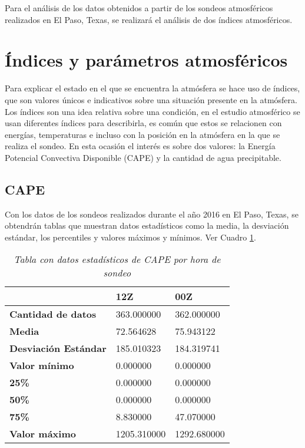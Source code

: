 Para el análisis de los datos obtenidos a partir de los sondeos atmosféricos realizados en El Paso, Texas, se realizará el análisis de dos índices atmosféricos.

\section{Índices y parámetros atmosféricos}
\noindent Para explicar el estado en el que se encuentra la atmósfera se hace uso de índices, que son valores únicos e indicativos sobre una situación presente en la atmósfera. Los índices son una idea relativa sobre una condición, en el estudio atmosférico se usan diferentes índices para describirla, es común que estos se relacionen con energías, temperaturas e incluso con la posición en la atmósfera en la que se realiza el sondeo. En esta ocasión el interés es sobre dos valores: la Energía Potencial Convectiva Disponible (CAPE) y la cantidad de agua precipitable. \cite{blanchard1998assessing}

\subsection{CAPE}
\noindent Con los datos de los sondeos realizados durante el año 2016 en El Paso, Texas, se obtendrán tablas que muestran datos estadísticos como la media, la desviación estándar, los percentiles y valores máximos y mínimos. Ver Cuadro \ref{capetable}.
\pagebreak
\begin{table}[ht!]
\centering
\caption{\textit{Tabla con datos estadísticos de CAPE por hora de sondeo}}
\label{capetable}
\begin{tabular}{|l|l|l|}
\hline
               & \textbf{12Z} & \textbf{00Z} \\ \hline
\textbf{Cantidad de datos} & 363.000000   & 362.000000   \\ \hline
\textbf{Media}  & 72.564628    & 75.943122    \\ \hline
\textbf{Desviación Estándar}   & 185.010323   & 184.319741   \\ \hline
\textbf{Valor mínimo}   & 0.000000     & 0.000000     \\ \hline
\textbf{25\%}  & 0.000000     & 0.000000     \\ \hline
\textbf{50\%}  & 0.000000     & 0.000000     \\ \hline
\textbf{75\%}  & 8.830000     & 47.070000    \\ \hline
\textbf{Valor máximo}   & 1205.310000  & 1292.680000  \\ \hline
\end{tabular}
\end{table}

